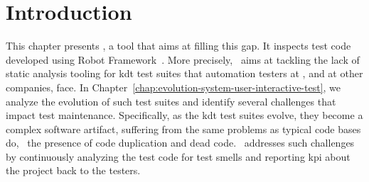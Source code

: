 \section{Introduction}

This chapter presents \tool, a tool that aims at filling this gap. It inspects test code developed using Robot Framework~\cite{RobotFramework2020}. More precisely, \tool~aims at tackling the lack of static analysis tooling for \gls{kdt} test suites that automation testers at \BGL, and at other companies, face. In Chapter~\ref{chap:evolution-system-user-interactive-test}, we analyze the evolution of such test suites and identify several challenges that impact test maintenance. Specifically, as the \gls{kdt} test suites evolve, they become a complex software artifact, suffering from the same problems as typical code bases do, \eg\ the presence of code duplication and dead code. \tool~addresses such challenges by continuously analyzing the test code for test smells and reporting \gls{kpi} about the project back to the testers.